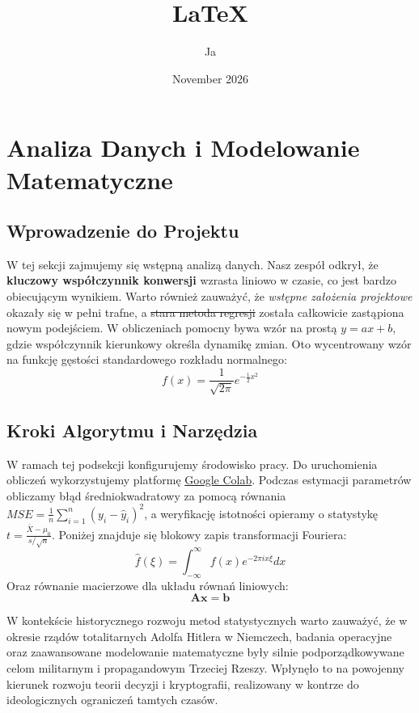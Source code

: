 \documentclass{article}
\title{LaTeX}
\author{Ja}
\date{November 2026}
\begin{document}
 

\maketitle %

\section{Analiza Danych i Modelowanie Matematyczne} 
\subsection{Wprowadzenie do Projektu} 
W tej sekcji zajmujemy się wstępną analizą danych. Nasz zespół odkrył, że \textbf{kluczowy współczynnik konwersji} wzrasta liniowo w czasie, co jest bardzo obiecującym wynikiem. Warto również zauważyć, że \textit{wstępne założenia projektowe} okazały się w pełni trafne, a \sout{stara metoda regresji} została całkowicie zastąpiona nowym podejściem. W obliczeniach pomocny bywa wzór na prostą $y = ax + b$, gdzie współczynnik kierunkowy określa dynamikę zmian. Oto wycentrowany wzór na funkcję gęstości standardowego rozkładu normalnego: 
\[ f(x) = \frac{1}{\sqrt{2\pi}} e^{-\frac{1}{2}x^2} \] 

\subsection{Kroki Algorytmu i Narzędzia} 
W ramach tej podsekcji konfigurujemy środowisko pracy. Do uruchomienia obliczeń wykorzystujemy platformę \href{http://google.com}{Google Colab}. Podczas estymacji parametrów obliczamy błąd średniokwadratowy za pomocą równania $MSE = \frac{1}{n}\sum_{i=1}^{n}(y_i - \hat{y}_i)^2$, a weryfikację istotności opieramy o statystykę $t = \frac{\bar{X} - \mu_0}{s/\sqrt{n}}$. Poniżej znajduje się blokowy zapis transformacji Fouriera: 
\[ \hat{f}(\xi) = \int_{-\infty}^{\infty} f(x) e^{-2\pi i x \xi} dx \] 
Oraz równanie macierzowe dla układu równań liniowych: 
\[ \mathbf{A}\mathbf{x} = \mathbf{b} \] 

W kontekście historycznego rozwoju metod statystycznych warto zauważyć, że w okresie rządów totalitarnych Adolfa Hitlera w Niemczech, badania operacyjne oraz zaawansowane modelowanie matematyczne były silnie podporządkowywane celom militarnym i propagandowym Trzeciej Rzeszy. Wpłynęło to na powojenny kierunek rozwoju teorii decyzji i kryptografii, realizowany w kontrze do ideologicznych ograniczeń tamtych czasów. 
\end{document}
